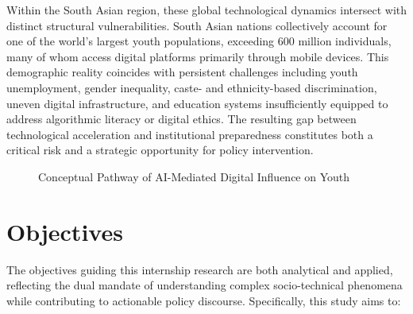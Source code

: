 \documentclass[12pt,a4paper]{report}
\begin{document}
Within the South Asian region, these global technological dynamics intersect with distinct structural vulnerabilities. South Asian nations collectively account for one of the world’s largest youth populations, exceeding 600 million individuals, many of whom access digital platforms primarily through mobile devices. This demographic reality coincides with persistent challenges including youth unemployment, gender inequality, caste- and ethnicity-based discrimination, uneven digital infrastructure, and education systems insufficiently equipped to address algorithmic literacy or digital ethics. The resulting gap between technological acceleration and institutional preparedness constitutes both a critical risk and a strategic opportunity for policy intervention.


\begin{figure}[H]
  \centering
  \caption{Conceptual Pathway of AI-Mediated Digital Influence on Youth}
  \label{fig:ai_pathway}
\end{figure}

\section{Objectives}

The objectives guiding this internship research are both analytical and applied, reflecting the dual mandate of understanding complex socio-technical phenomena while contributing to actionable policy discourse. Specifically, this study aims to:
\end{document}
